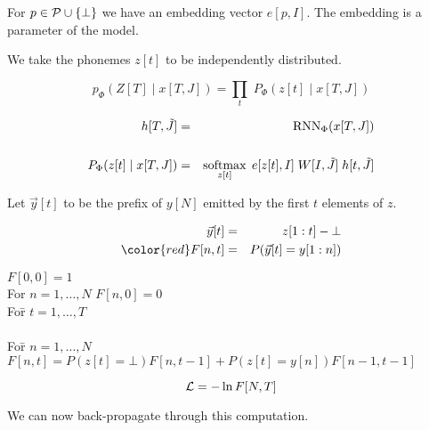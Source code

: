 {

For $p \in {\cal P} \cup \{\bot\}$ we have an embedding vector $e[p,I]$.  The embedding is a parameter of the model.

\vfill
We take the phonemes $z[t]$ to be independently distributed.

$$p_\Phi(Z[T]\;|\; x[T,J]) = \prod_t \;P_\Phi(z[t]\;|\;x[T,J])$$

\begin{eqnarray*}
  h[T,\tilde{J}] & = & \mathrm{RNN}_\Phi(x[T,J]) \\
  \\
  P_\Phi(z[t]\;|\;x[T,J]) & = & \operatorname*{softmax}_{z[t]} \;e[z[t],I]\;W[I,\tilde{J}]\;h[t,\tilde{J}]
\end{eqnarray*}


Let $\vec{y}[t]$ to be the prefix of $y[N]$ emitted by the first $t$ elements of $z$.

\begin{eqnarray*}
  \vec{y}[t] & = & z[1:t] -\bot \\
  {\color{red} F[n,t]} & = & P(\vec{y}[t] = y[1:n])
\end{eqnarray*}

\vfill
\begin{tabbing}
  {\color{red} $F[0,0] = 1$} \\
  For $n = 1,\ldots,N$ {\color{red} $F[n,0] = 0$} \\
  Fo\=r $t = 1,\dots,T$ \\
       \\
      \> Fo\=r $n = 1,\ldots, N$ \\
      \>     \> {\color{red} $F[n,t] = P(z[t] = \bot) F[n,t-1] + P(z[t] = y[n])F[n-1,t-1]$}
\end{tabbing}


{\color{red} $${\cal L} = - \ln F[N,T]$$}

We can now back-propagate through this computation.

}


